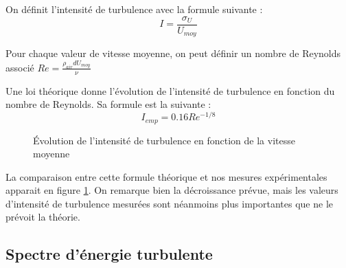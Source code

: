 \documentclass[12pt, a4paper]{report}
\begin{document}
	On définit l'intensité de turbulence avec la formule suivante : 
	\begin{equation*}
		I = \frac{\sigma_{U}}{U_{moy}}
	\end{equation*}
	
	Pour chaque valeur de vitesse moyenne, on peut définir un nombre de Reynolds associé $Re = \frac{\rho_{air} d U_{moy}}{\nu}$
	
	Une loi théorique donne l'évolution de l'intensité de turbulence en fonction du nombre de Reynolds. Sa formule est la suivante :
	\begin{equation*}
		I_{emp} = 0.16Re^{-1/8}
	\end{equation*}
	
	\begin{figure}[h]
		\centering
		\caption{Évolution de l'intensité de turbulence en fonction de la vitesse moyenne}
		\label{intensite_de_turbulence}
	\end{figure}
	
	La comparaison entre cette formule théorique et nos mesures expérimentales apparait en figure \ref{intensite_de_turbulence}. On remarque bien la décroissance prévue, mais les valeurs d'intensité de turbulence mesurées sont néanmoins plus importantes que ne le prévoit la théorie.

	\subsection{Spectre d'énergie turbulente}
	
\end{document}
